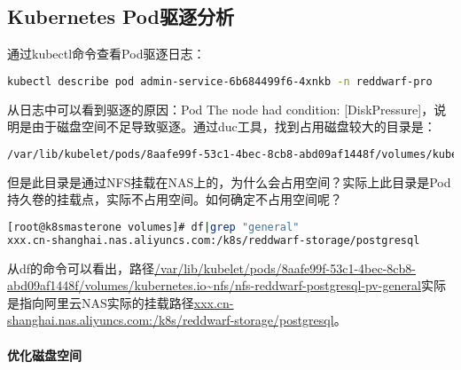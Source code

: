 \documentclass[../../../interview-questions.tex]{subfiles}
\begin{document}
\subsection{Kubernetes Pod驱逐分析}

通过kubectl命令查看Pod驱逐日志：

\begin{lstlisting}[language=Bash]
kubectl describe pod admin-service-6b684499f6-4xnkb -n reddwarf-pro    
\end{lstlisting}

从日志中可以看到驱逐的原因：Pod The node had condition: [DiskPressure]，说明是由于磁盘空间不足导致驱逐。通过duc工具，找到占用磁盘较大的目录是：

\begin{lstlisting}[language=Bash]
/var/lib/kubelet/pods/8aafe99f-53c1-4bec-8cb8-abd09af1448f/volumes/kubernetes.io~nfs/nfs-reddwarf-postgresql-pv-general/
\end{lstlisting}

但是此目录是通过NFS挂载在NAS上的，为什么会占用空间？实际上此目录是Pod持久卷的挂载点，实际不占用空间。如何确定不占用空间呢？

\begin{lstlisting}[language=Bash]
[root@k8smasterone volumes]# df|grep "general"
xxx.cn-shanghai.nas.aliyuncs.com:/k8s/reddwarf-storage/postgresql          10995116277760  8651776 10995107625984   1% /var/lib/kubelet/pods/8aafe99f-53c1-4bec-8cb8-abd09af1448f/volumes/kubernetes.io~nfs/nfs-reddwarf-postgresql-pv-general
\end{lstlisting}

从df的命令可以看出，路径\url{/var/lib/kubelet/pods/8aafe99f-53c1-4bec-8cb8-abd09af1448f/volumes/kubernetes.io~nfs/nfs-reddwarf-postgresql-pv-general}实际是指向阿里云NAS实际的挂载路径\url{xxx.cn-shanghai.nas.aliyuncs.com:/k8s/reddwarf-storage/postgresql}。

\paragraph{优化磁盘空间}
\end{document}
